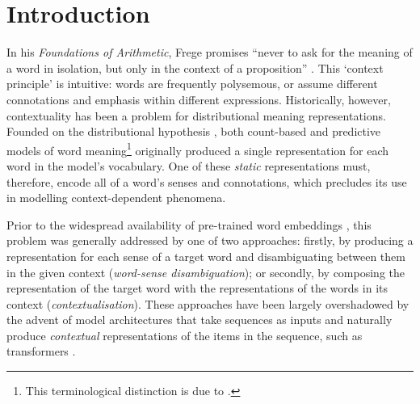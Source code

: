 
\section{Introduction}

In his \emph{Foundations of Arithmetic}, Frege promises ``never to ask for the meaning
of a word in isolation, but only in the context of a proposition''
\parencite*[xvii]{Frege1980}.
This `context principle' is intuitive: words are frequently polysemous, or assume
different connotations and emphasis within different expressions.
Historically, however, contextuality has been a problem for distributional meaning
representations.
Founded on the distributional hypothesis \parencites{Harris1954}{Firth1957}, both
count-based and predictive models of word meaning\footnote{ This terminological
  distinction is due to \textcite{Baroni2014a}.
} originally
produced a single representation for each word in the model's vocabulary.
One of these \emph{static} representations must, therefore, encode all of a word's
senses and connotations, which precludes its use in modelling context-dependent
phenomena.

Prior to the widespread availability of pre-trained word embeddings
\parencites[e.g.,][]{Mikolov2013}{Pennington2014}, this problem was generally addressed
by one of two approaches: firstly, by producing a representation for each sense of a
target word and disambiguating between them in the given context (\emph{word-sense
  disambiguation}); or secondly, by composing the representation of the target word with
the representations of the words in its context (\emph{contextualisation}).
These approaches have been largely overshadowed by the advent of model architectures
that take sequences as inputs and naturally produce \emph{contextual} representations
of the items in the sequence, such as transformers \parencite{Vaswani2017}.

